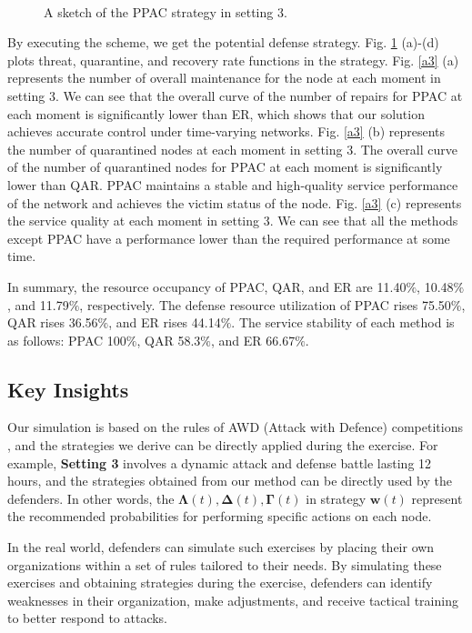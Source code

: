 \documentclass[lettersize,journal]{IEEEtran}
\begin{document}
\begin{figure}[h]
\centering
{}
\\
\caption{A sketch of the PPAC strategy in setting 3.}
\label{fig_ansofexample2}
\end{figure}
By executing the scheme, we get the potential defense strategy. Fig. \ref{fig_ansofexample2} (a)-(d) plots threat, quarantine, and recovery rate functions in the strategy. Fig. \ref{a3} (a) represents the number of overall maintenance for the node at each moment in setting 3. We can see that the overall curve of the number of repairs for PPAC at each moment is significantly lower than ER, which shows that our solution achieves accurate control under time-varying networks. Fig. \ref{a3} (b) represents the number of quarantined nodes at each moment in setting 3. The overall curve of the number of quarantined nodes for PPAC at each moment is significantly lower than QAR. PPAC maintains a stable and high-quality service performance of the network and achieves the victim status of the node. Fig. \ref{a3} (c) represents the service quality at each moment in setting 3. We can see that all the methods except PPAC have a performance lower than the required performance at some time. \par


In summary, the resource occupancy of PPAC, QAR, and ER are 11.40$\%$, 10.48$\%$, and 11.79$\%$, respectively. The defense resource utilization of PPAC rises 75.50$\%$, QAR rises 36.56$\%$, and ER rises 44.14$\%$. The service stability of each method is as follows: PPAC 100$\%$, QAR 58.3$\%$, and ER 66.67$\%$. 
\subsection{Key Insights}
Our simulation is based on the rules of AWD (Attack with Defence) competitions \cite{CTFtime, CTFwiki}, and the strategies we derive can be directly applied during the exercise. For example,  \textbf{Setting 3} involves a dynamic attack and defense battle lasting 12 hours, and the strategies obtained from our method can be directly used by the defenders. In other words, the $\mathbf{\Lambda}(t),\mathbf{\Delta}(t),\mathbf{\Gamma}(t)$ in strategy $\bm{w}(t)$ represent the recommended probabilities for performing specific actions on each node.
\par
 In the real world, defenders can simulate such exercises by placing their own organizations within a set of rules tailored to their needs. By simulating these exercises and obtaining strategies during the exercise, defenders can identify weaknesses in their organization, make adjustments, and receive tactical training to better respond to attacks.
\end{document}
